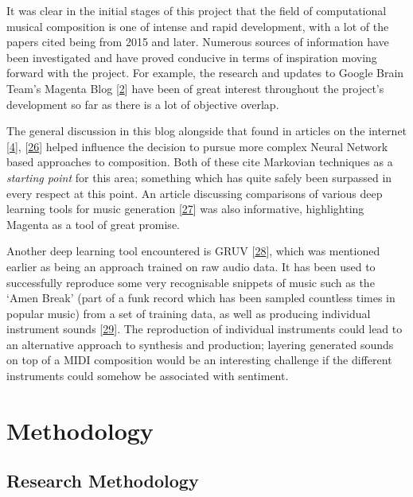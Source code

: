 \documentclass[12pt,]{article}
\begin{document}
It was clear in the initial stages of this project that the field of
computational musical composition is one of intense and rapid
development, with a lot of the papers cited being from 2015 and later.
Numerous sources of information have been investigated and have proved
conducive in terms of inspiration moving forward with the project. For
example, the research and updates to Google Brain Team's Magenta Blog
{[}\protect\hyperlink{ref-magenta}{2}{]} have been of great interest
throughout the project's development so far as there is a lot of
objective overlap.

The general discussion in this blog alongside that found in articles on
the internet {[}\protect\hyperlink{ref-mediumkylemcdonald}{4}{]},
{[}\protect\hyperlink{ref-mkofler}{26}{]} helped influence the decision
to pursue more complex Neural Network based approaches to composition.
Both of these cite Markovian techniques as a \emph{starting point} for
this area; something which has quite safely been surpassed in every
respect at this point. An article discussing comparisons of various deep
learning tools for music generation
{[}\protect\hyperlink{ref-asimovinst}{27}{]} was also informative,
highlighting Magenta as a tool of great promise.

Another deep learning tool encountered is GRUV
{[}\protect\hyperlink{ref-nayebi2015gruv}{28}{]}, which was mentioned
earlier as being an approach trained on raw audio data. It has been used
to successfully reproduce some very recognisable snippets of music such
as the `Amen Break' (part of a funk record which has been sampled
countless times in popular music) from a set of training data, as well
as producing individual instrument sounds
{[}\protect\hyperlink{ref-fiala}{29}{]}. The reproduction of individual
instruments could lead to an alternative approach to synthesis and
production; layering generated sounds on top of a MIDI composition would
be an interesting challenge if the different instruments could somehow
be associated with sentiment.

\hypertarget{methodology}{%
\section{Methodology}\label{methodology}}

\hypertarget{research-methodology}{%
\subsection{Research Methodology}\label{research-methodology}}
\end{document}
